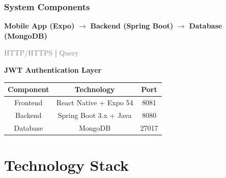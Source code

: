 \documentclass[11pt]{beamer}
\begin{document}
\begin{frame}
\frametitle{System Components}
\begin{center}
\textbf{Mobile App (Expo)}  $\rightarrow$  \textbf{Backend (Spring Boot)}  $\rightarrow$  \textbf{Database (MongoDB)}

\vspace{0.5cm}
\textcolor{gray}{HTTP/HTTPS}  |  \textcolor{gray}{Query}

\vspace{0.5cm}
\textbf{\colorbox{darkorange!20}{JWT Authentication Layer}}
\end{center}

\vspace{1cm}
\begin{tabular}{|c|c|c|}
\hline
\textbf{Component} & \textbf{Technology} & \textbf{Port} \\
\hline
Frontend & React Native + Expo 54 & 8081 \\
Backend & Spring Boot 3.x + Java & 8080 \\
Database & MongoDB & 27017 \\
\hline
\end{tabular}
\end{frame}

\section{Technology Stack}
\end{document}

